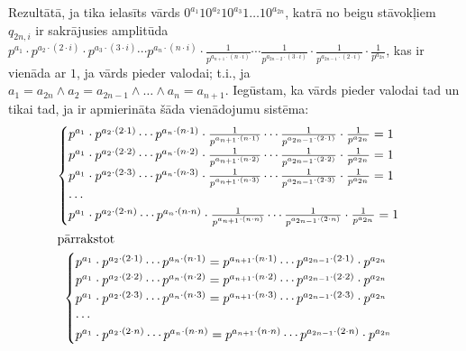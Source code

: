 \documentclass{ludis}
\begin{document}
\begin{pieradijums}
Rezultātā, ja tika ielasīts vārds $0^{a_1}10^{a_2}10^{a_3}1\ldots 10^{a_{2n}}$, katrā no beigu stāvokļiem $q_{2n,i}$ ir sakrājusies amplitūda
$p^{a_1}\cdot p^{a_2 \cdot (2\cdot i)}\cdot p^{a_3 \cdot (3\cdot i)}\cdots p^{a_n \cdot (n\cdot i)} \cdot \frac{1}{p^{a_{n+1} \cdot (n\cdot i)}}\cdots \frac{1}{p^{a_{2n-2} \cdot (3\cdot i)}}\cdot \frac{1}{p^{a_{2n-1} \cdot (2\cdot i)}}\cdot \frac{1}{p^{a_{2n}}}$,
kas ir vienāda ar $1$, ja vārds pieder valodai; t.i., ja
$a_1 = a_{2n} \wedge a_2 = a_{2n-1} \wedge \ldots \wedge a_n = a_{n+1}$.
Iegūstam, ka vārds pieder valodai tad un tikai tad, ja ir apmierināta šāda vienādojumu sistēma:
\begin{gather*}
\allowdisplaybreaks
	\begin{cases}
		p^{a_1}\cdot p^{a_2 \cdot (2\cdot 1)} \cdots p^{a_n \cdot (n\cdot 1)} \cdot \frac{1}{p^{a_{n+1} \cdot (n\cdot 1)}}\cdots \frac{1}{p^{a_{2n-1} \cdot (2\cdot 1)}}\cdot \frac{1}{p^{a_{2n}}} = 1\\
		p^{a_1}\cdot p^{a_2 \cdot (2\cdot 2)}\cdots p^{a_n \cdot (n\cdot 2)} \cdot \frac{1}{p^{a_{n+1} \cdot (n\cdot 2)}}\cdots \frac{1}{p^{a_{2n-1} \cdot (2\cdot 2)}}\cdot \frac{1}{p^{a_{2n}}} = 1\\
		p^{a_1}\cdot p^{a_2 \cdot (2\cdot 3)}\cdots p^{a_n \cdot (n\cdot 3)} \cdot \frac{1}{p^{a_{n+1} \cdot (n\cdot 3)}}\cdots \frac{1}{p^{a_{2n-1} \cdot (2\cdot 3)}}\cdot \frac{1}{p^{a_{2n}}} = 1\\
		\cdots \\
		p^{a_1}\cdot p^{a_2 \cdot (2\cdot n)}\cdots p^{a_n \cdot (n\cdot n)} \cdot \frac{1}{p^{a_{n+1} \cdot (n\cdot n)}}\cdots \frac{1}{p^{a_{2n-1} \cdot (2\cdot n)}}\cdot \frac{1}{p^{a_{2n}}} = 1\\
	\end{cases}\\
\intertext{pārrakstot}
	\begin{cases}
		p^{a_1}\cdot p^{a_2 \cdot (2\cdot 1)} \cdots p^{a_n \cdot (n\cdot 1)} = p^{a_{n+1} \cdot (n\cdot 1)}\cdots p^{a_{2n-1} \cdot (2\cdot 1)}\cdot p^{a_{2n}}\\
		p^{a_1}\cdot p^{a_2 \cdot (2\cdot 2)} \cdots p^{a_n \cdot (n\cdot 2)} = p^{a_{n+1} \cdot (n\cdot 2)}\cdots p^{a_{2n-1} \cdot (2\cdot 2)}\cdot p^{a_{2n}}\\
		p^{a_1}\cdot p^{a_2 \cdot (2\cdot 3)} \cdots p^{a_n \cdot (n\cdot 3)} = p^{a_{n+1} \cdot (n\cdot 3)}\cdots p^{a_{2n-1} \cdot (2\cdot 3)}\cdot p^{a_{2n}}\\
		\cdots \\
		p^{a_1}\cdot p^{a_2 \cdot (2\cdot n)} \cdots p^{a_n \cdot (n\cdot n)} = p^{a_{n+1} \cdot (n\cdot n)}\cdots p^{a_{2n-1} \cdot (2\cdot n)}\cdot p^{a_{2n}}\\

\end{cases}
\end{gather*}
\end{pieradijums}
\end{document}
